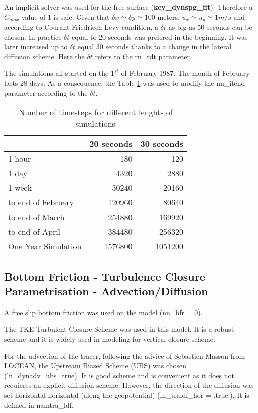 \documentclass[english]{PFeENSTA}
\begin{document}
{An implicit solver was used for the free surface (\textbf{key\_dynspg\_flt}). Therefore a $C_{max}$ value of 1 is safe. Given that $\delta x \simeq \delta y \simeq 100 $ meters, $u_x \simeq u_y \simeq 1 m/s $ and according to Courant-Friedriech-Levy condition, a $\delta t $ as big as 50 seconds can be chosen. In practice $\delta t$ equal to 20 seconds was prefered in the beginning. It was later increased up to $\delta t$ equal 30 seconds thanks to a change in the lateral diffusion scheme.  Here the $\delta t$ refers to the rn\_rdt parameter.

The simulations all started on the $1^{st}$ of February 1987. The month of February lasts 28 days. As a consequence, the Table \ref{TIME_TABLE} was used to modify the nn\_itend parameter according to the $\delta t $.

\begin{table}[H]
\begin{center}
  \begin{tabular}{| l | r | r| }
    \hline
      & 20 seconds & 30 seconds \\ \hline
    1 hour & 180 & 120 \\ \hline
    1 day  & 4320 &	2880 \\ \hline
    1 week & 30240 & 20160 \\ \hline
    to end of February  & 120960 &	80640 \\ \hline
    to end of March  & 254880 &	169920 \\ \hline
    to end of April  & 384480 &	256320\\ \hline
    One Year Simulation  & 1576800 &	1051200 \\ 
    \hline
  \end{tabular}
  \end{center}
  \caption{\label{TIME_TABLE} Number of timesteps for different lenghts of simulations}
\end{table}

\subsection{Bottom Friction - Turbulence Closure Parametrisation - Advection/Diffusion}
A free slip bottom friction was used on the model (nn\_bfr = 0). 


The TKE Turbulent Closure Scheme was used in this model. It is a robust scheme and it is widely used in modeling for vertical closure scheme.


For the advection of the tracer, following the advice of Sebastien Masson from LOCEAN,  the Upstream Biased Scheme (UBS) was chosen (ln\_dynadv\_ubs=true). It is good scheme and is convenient as it does not requieres an explicit diffusion scheme. However, the direction of the diffusion was set horizontal horizontal (along the geopotential) (ln\_traldf\_hor = .true.). It is defined in namtra\_ldf.


}
\end{document}
